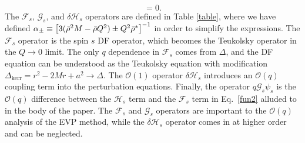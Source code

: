 \begin{refsection}
\begin{equation}
=0.
\label{fun2}
\end{equation}
The $\mathcal{F}_s$, $\mathcal{G}_s$, and $\delta \mathcal{H}_s$ operators are defined in Table \ref{table}, where we have defined $\alpha_\pm \equiv \left[3(\bar{\rho}^2M-\bar{\rho} Q^2)\pm Q^2\bar{\rho}^*\right]^{-1}$ in order to simplify the expressions. The $\mathcal{F}_s$ operator is the spin $s$ DF operator, which becomes the Teukolsky operator in the $Q \to 0$ limit. The only $q$ dependence in $\mathcal{F}_s$ comes from $\Delta$, and the DF equation can be understood as the Teukolsky equation with modification $\Delta_\text{kerr} =r^2-2Mr+a^2 \to \Delta$. The $\mathcal{O}(1)$ operator $\delta\mathcal{H}_s$ introduces an $\mathcal{O}(q)$ coupling term into the perturbation equations. Finally, the operator $q\mathcal{G}_s \psi_s$ is the $\mathcal{O}(q)$ difference between the $\mathcal{H}_s$ term and the $\mathcal{F}_s$ term in Eq.~\eqref{fun2} alluded to in the body of the paper. The $\mathcal{F}_s$ and $\mathcal{G}_s$ operators are important to the $\mathcal{O}(q)$ analysis of the EVP method, while the  $\delta\mathcal{H}_s$ operator comes in at higher order and can be neglected.



\end{refsection}

